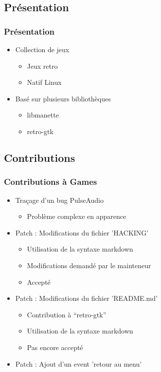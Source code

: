 \documentclass{beamer}
\begin{document}
\subsection{Présentation}
\begin{frame}
  \frametitle{Présentation}
  \begin{itemize}
  \item Collection de jeux \pause
    \begin{itemize}
    \item Jeux retro
    \item Natif Linux \pause
    \end{itemize}
  \item Basé sur plusieurs bibliothèques \pause
    \begin{itemize}
    \item libmanette
    \item retro-gtk
    \end{itemize}
  \end{itemize}
\end{frame}

\subsection{Contributions}
\begin{frame}
  \frametitle{Contributions à Games}
  \begin{itemize}
  \item Traçage d'un bug PulseAudio \pause
    \begin{itemize}
      \item Problème complexe en apparence \pause
    \end{itemize}
  \item Patch : Modifications du fichier 'HACKING' \pause
    \begin{itemize}
    \item Utilisation de la syntaxe markdown
    \item Modifications demandé par le mainteneur
    \item Accepté \pause
    \end{itemize}
  \item Patch : Modifications du fichier 'README.md' \pause
    \begin{itemize}
    \item Contribution à ``retro-gtk''
    \item Utilisation de la syntaxe markdown
    \item Pas encore accepté \pause
    \end{itemize}
  \item Patch : Ajout d'un event 'retour au menu'
  \end{itemize}
\end{frame}
\end{document}
